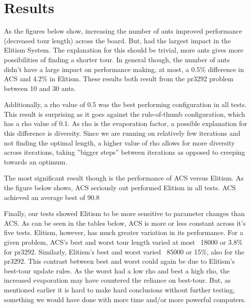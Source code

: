 \documentclass[11pt,twocolumn]{article}
\begin{document}
\section{Results} 
As the figures below show, increasing the number of ants improved performance (decreased tour length) across the board. But, had the largest impact in the Elitism System. The explanation for this should be trivial, more ants gives more possibilities of finding a shorter tour. In general though, the number of ants didn’t have a large impact on performance making, at most, a 0.5\% difference in ACS and 4.2\% in Elitism. These results both result from the pr3292 problem between 10 and 30 ants. 

Additionally, a rho value of 0.5 was the best performing configuration in all tests. This result is surprising as it goes against the rule-of-thumb configuration, which has a rho value of 0.1. As rho is the evaporation factor, a possible explanation for this difference is diversity. Since we are running on relatively few iterations and not finding the optimal length, a higher value of rho allows for more diversity across iterations, taking ''bigger steps'' between iterations as opposed to creeping towards an optimum. 

The most significant result though is the performance of ACS versus Elitism. As the figure below shows, ACS seriously out performed Elitism in all tests. ACS achieved an average best of 90.8%

Finally, our tests showed Elitism to be more sensitive to parameter changes than ACS. As can be seen in the tables below, ACS is more or less constant across it’s five tests. Elitism, however, has much greater variation in its performance. For a given problem, ACS’s best and worst tour length varied at most ~18000 or 3.8\% for pr3292. Similarly, Elitism’s best and worst varied ~85000 or 15\%, also for the pr3292. This contrast between best and worst could again be due to Elitism’s best-tour update rules. As the worst had a low rho and best a high rho, the increased evaporation may have countered the reliance on best-tour. But, as mentioned earlier it is hard to make hard conclusions without further testing, something we would have done with more time and/or more powerful computers.
\end{document}
